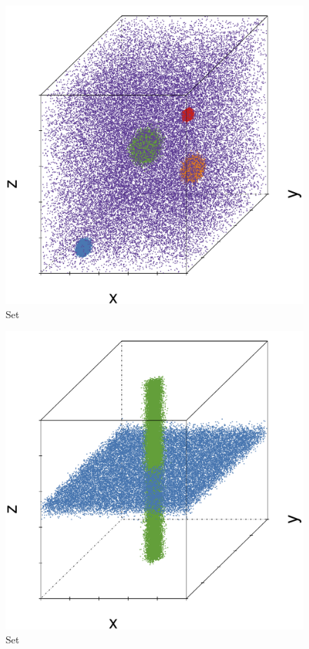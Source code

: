 \begin{subfigure}{0.23\textwidth}
	\centering
	\includegraphics[width=\textwidth]{3/img/datasetplot_ferdosi_3_120000.pdf}
	\caption{Set \ferdosiThree}
	\label{fig:3:simulated:datasets:ferdosi3}
\end{subfigure}	
\begin{subfigure}{0.23\textwidth}
	\centering
	\includegraphics[width=\textwidth]{3/img/datasetplot_ferdosi_4_60000.pdf}
	\caption{Set \ferdosiFour}
	\label{fig:3:simulated:datasets:ferdosi4}
\end{subfigure}
